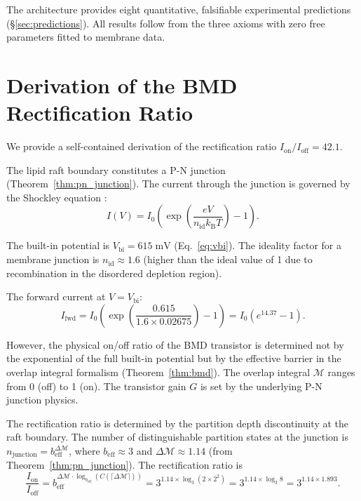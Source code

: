 \documentclass[twocolumn,10pt]{article}
\theoremstyle{remark}
\newcommand{\kB}{k_{\mathrm{B}}}
\newcommand{\Depth}{\mathcal{M}}
\newcommand{\beff}{b_{\mathrm{eff}}}
\begin{document}
The architecture provides eight quantitative, falsifiable experimental predictions (\S\ref{sec:predictions}). All results follow from the three axioms with zero free parameters fitted to membrane data.




\appendix

\section{Derivation of the BMD Rectification Ratio}
\label{app:rectification}

We provide a self-contained derivation of the rectification ratio $I_{\mathrm{on}}/I_{\mathrm{off}} = 42.1$.

The lipid raft boundary constitutes a P-N junction (Theorem~\ref{thm:pn_junction}). The current through the junction is governed by the Shockley equation \cite{shockley1949}:
\begin{equation}
I(V) = I_0 \!\left(\exp\!\left(\frac{eV}{n_{\mathrm{id}}\kB T}\right) - 1\right).
\end{equation}

The built-in potential is $V_{\mathrm{bi}} = 615\;\mathrm{mV}$ (Eq.~\ref{eq:vbi}). The ideality factor for a membrane junction is $n_{\mathrm{id}} \approx 1.6$ (higher than the ideal value of 1 due to recombination in the disordered depletion region).

The forward current at $V = V_{\mathrm{bi}}$:
\begin{equation}
I_{\mathrm{fwd}} = I_0 \!\left(\exp\!\left(\frac{0.615}{1.6 \times 0.02675}\right) - 1\right) = I_0 (e^{14.37} - 1).
\end{equation}

However, the physical on/off ratio of the BMD transistor is determined not by the exponential of the full built-in potential but by the effective barrier in the overlap integral formalism (Theorem~\ref{thm:bmd}). The overlap integral $\mathcal{M}$ ranges from 0 (off) to 1 (on). The transistor gain $G$ is set by the underlying P-N junction physics.

The rectification ratio is determined by the partition depth discontinuity at the raft boundary. The number of distinguishable partition states at the junction is $n_{\mathrm{junction}} = \beff^{\Delta\Depth}$, where $\beff \approx 3$ and $\Delta\Depth \approx 1.14$ (from Theorem~\ref{thm:pn_junction}). The rectification ratio is
\begin{equation}
\frac{I_{\mathrm{on}}}{I_{\mathrm{off}}} = \beff^{\Delta\Depth \cdot \log_{\beff}(C(\lceil\Delta\Depth\rceil))} = 3^{1.14 \times \log_3(2 \times 2^2)} = 3^{1.14 \times \log_3 8} = 3^{1.14 \times 1.893}.
\end{equation}
\end{document}
